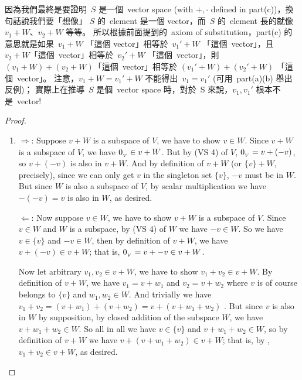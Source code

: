 \begin{note}
因為我們最終是要證明\ \(S\) 是一個\ vector space (with \(+, \cdot\) defined in part(c))，換句話說我們要「想像」 \(S\) 的\ element 是一個 vector，而\ \(S\) 的\ element 長的就像\ \(v_1 + W\)、\(v_2 + W\) 等等。
所以根據前面提到的\ axiom of substitution，part(c) 的意思就是如果\ \(v_1 + W\) 「這個 vector」相等於\ \(v_1' + W\) 「這個\ vector」，且\ \(v_2 + W\)「這個\ vector」相等於\ \(v_2' + W\) 「這個\ vector」，則\ \((v_1 + W) + (v_2 + W)\)「這個\ vector」相等於 \((v_1' + W) + (v_2' + W)\) 「這個\ vector」。
注意，\(v_1 + W = v_1' + W\) 不能得出\ \(v_1 = v_1'\) (可用\ part(a)(b) 舉出反例)；
實際上在推導\ \(S\) 是個\ vector space 時，對於\ S 來說，\(v_1, v_1'\) 根本不是\ vector!
\end{note}

\begin{proof}\ 

\begin{enumerate}
\item
\(\Longrightarrow\): Suppose \(v + W\) is a subspace of \(V\), we have to show \(v \in W\).
Since \(v + W\) is a subspace of \(V\), we have \(0_{_V} \in v + W\).
But by (VS 4) of \(V\), \(0_{_V} = v + (-v)\), so \(v + (-v)\) is also in \(v + W\).
And by definition of \(v + W\) (or \(\{ v \} + W\), precisely), since we can only get \(v\) in the singleton set \(\{ v \}\), \(-v\) must be in \(W\).
But since \(W\) is also a subspace of \(V\), by scalar multiplication we have \(-(-v) = v\) is also in \(W\), as desired.

\(\Longleftarrow\): Now suppose \(v \in W\), we have to show \(v + W\) is a subspace of \(V\).
Since \(v \in W\) and \(W\) is a subspace, by (VS 4) of \(W\) we have \(-v \in W\).
So we have \(v \in \{ v \}\) and \(-v \in W\), then by definition of \(v + W\), we have \(v + (-v) \in v + W\);
that is, \(0_{_V} = v + -v \in v + W\).

Now let arbitrary \(v_1, v_2 \in v + W\), we have to show \(v_1 + v_2 \in v + W\).
By definition of \(v + W\), we have \(v_1 = v + w_1\) and \(v_2 = v + w_2\) where \(v\) is of course belongs to \(\{ v \}\) and \(w_1, w_2 \in W\).
And trivially we have \(v_1 + v_2 = (v + w_1) + (v + w_2) = v + (v + w_1 + w_2)\) .
But since \(v\) is also in \(W\) by supposition, by closed addition of the subspace \(W\), we have \(v + w_1 + w_2 \in W\).
So all in all we have \(v \in \{ v \}\) and \(v + w_1 + w_2 \in W\), so by definition of \(v + W\) we have \(v + (v + w_1 + w_2) \in v + W\);
that is, by , \(v_1 + v_2 \in v + W\), as desired.


\end{enumerate}
\end{proof}
